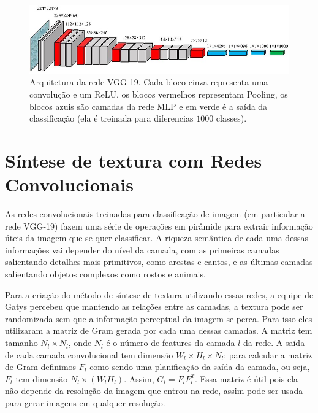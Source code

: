 \begin{figure}[!ht]
	\centering
	\includegraphics[width=\linewidth*5/6]{files/assets/deeplearning/vgg19.png}
	\caption{Arquitetura da rede VGG-19. Cada bloco cinza representa
	uma convolução e um ReLU, os blocos vermelhos representam 
	Pooling, os blocos azuis são camadas da rede MLP e em verde é a
	saída da classificação (ela é treinada para diferencias $1000$
	classes).}
	\label{img:preview}
\end{figure}





\section{Síntese de textura com Redes Convolucionais}

As redes convolucionais
treinadas para classificação de imagem (em particular
a rede VGG-19) fazem uma série de operações em
pirâmide para extrair informação úteis da imagem que
se quer classificar. A riqueza semântica de cada
uma dessas informações vai depender do nível da camada,
com as primeiras camadas salientando detalhes
mais primitivos, como arestas e cantos, e as últimas
camadas salientando objetos complexos como rostos
e animais.


Para a criação do método de síntese de textura
utilizando essas redes, a equipe de Gatys percebeu que 
mantendo as relações entre as camadas,
a textura pode ser randomizada sem que 
a informação perceptual da imagem se perca.
Para isso eles utilizaram a matriz de Gram gerada por cada
uma dessas camadas. A matriz tem tamanho $N_l \times N_l$,
onde $N_l$ é o número de features da camada $l$ da rede.
A saída de cada camada convolucional tem dimensão
$W_l\times H_l \times N_l$; para calcular a matriz de Gram
definimos $F_l$ como sendo uma planificação da 
saída da camada, ou seja, $F_l$ tem dimensão $N_l \times (W_l H_l)$.
Assim, $G_l = F_lF_l^T$. Essa matriz é útil pois ela não 
depende da resolução da imagem que entrou na rede,
assim pode ser usada para gerar imagens em
qualquer resolução.

